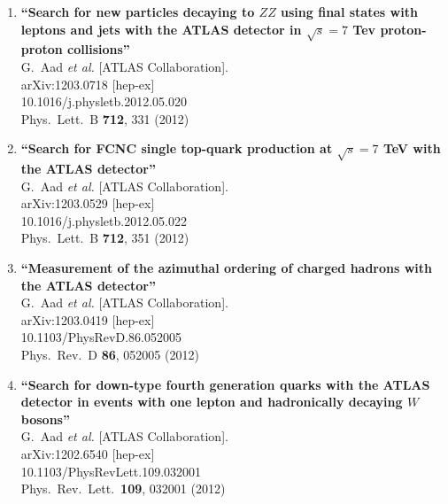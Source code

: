 \documentclass{article}
\begin{document}
\begin{enumerate}
\item%
{\bf ``Search for new particles decaying to $Z Z$ using final states with leptons and jets with the ATLAS detector in $\sqrt{s}=7$ Tev proton-proton collisions''}
  \\{}G.~Aad {\it et al.}  [ATLAS Collaboration].
  \\{}arXiv:1203.0718 [hep-ex]
    \\{}10.1016/j.physletb.2012.05.020
\\{}Phys.\ Lett.\ B {\bf 712}, 331 (2012) %


\item%
{\bf ``Search for FCNC single top-quark production at $\sqrt{s}=7$ TeV with the ATLAS detector''}
  \\{}G.~Aad {\it et al.}  [ATLAS Collaboration].
  \\{}arXiv:1203.0529 [hep-ex]
    \\{}10.1016/j.physletb.2012.05.022
\\{}Phys.\ Lett.\ B {\bf 712}, 351 (2012) %


\item%
{\bf ``Measurement of the azimuthal ordering of charged hadrons with the ATLAS detector''}
  \\{}G.~Aad {\it et al.}  [ATLAS Collaboration].
  \\{}arXiv:1203.0419 [hep-ex]
    \\{}10.1103/PhysRevD.86.052005
\\{}Phys.\ Rev.\ D {\bf 86}, 052005 (2012) %


\item%
{\bf ``Search for down-type fourth generation quarks with the ATLAS detector in events with one lepton and hadronically decaying $W$ bosons''}
  \\{}G.~Aad {\it et al.}  [ATLAS Collaboration].
  \\{}arXiv:1202.6540 [hep-ex]
    \\{}10.1103/PhysRevLett.109.032001
\\{}Phys.\ Rev.\ Lett.\  {\bf 109}, 032001 (2012) %



\end{enumerate}
\end{document}
